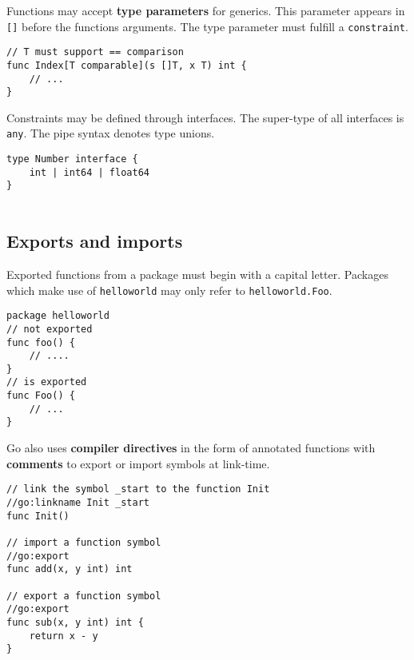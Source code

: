 \documentclass{article}
\begin{document}
\begin{paracol}{2}

Functions may accept \textbf{type parameters} for generics. This parameter appears in \lstinline|[]| before the functions arguments. The type parameter must fulfill a \lstinline|constraint|.
  
\switchcolumn
\begin{lstlisting}
// T must support == comparison
func Index[T comparable](s []T, x T) int {
    // ...
}

\end{lstlisting}
\switchcolumn*
\noindent Constraints may be defined through interfaces. The super-type of all interfaces is \lstinline|any|. The pipe syntax denotes type unions.

\switchcolumn

\begin{lstlisting}
type Number interface {
    int | int64 | float64
}
    
\end{lstlisting}

\end{paracol}

\subsection{Exports and imports}
\begin{paracol}{2}

Exported functions from a package must begin with a capital letter. Packages which make use of \lstinline{helloworld} may only refer to \lstinline{helloworld.Foo}.

\switchcolumn

\begin{lstlisting}
package helloworld
// not exported
func foo() {
    // ....
}
// is exported
func Foo() {
    // ...
}
\end{lstlisting}

\switchcolumn*

\noindent Go also uses \textbf{compiler directives} in the form of annotated functions with \textbf{comments} to export or import symbols at link-time.

\switchcolumn

\begin{lstlisting}
// link the symbol _start to the function Init
//go:linkname Init _start
func Init() 

// import a function symbol
//go:export
func add(x, y int) int

// export a function symbol
//go:export
func sub(x, y int) int {
    return x - y
}


\end{lstlisting}

\end{paracol}
\end{document}
